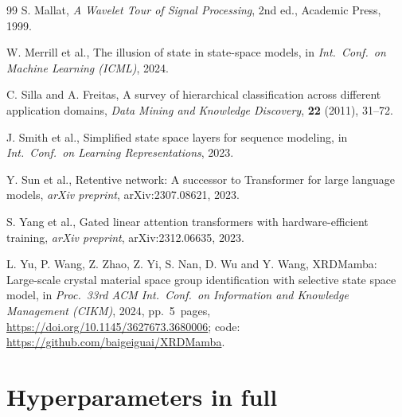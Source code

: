 \documentclass[final]{ws-ijwmip}
\begin{document}
\begin{thebibliography}{99}
S. Mallat, \emph{A Wavelet Tour of Signal Processing}, 2nd ed.,
Academic Press, 1999.

W. Merrill et al., The illusion of state in state-space models, in
\emph{Int.\ Conf.\ on Machine Learning (ICML)}, 2024.

C. Silla and A. Freitas, A survey of hierarchical classification across
different application domains, \emph{Data Mining and Knowledge
Discovery}, \textbf{22} (2011), 31--72.

J. Smith et al., Simplified state space layers for sequence modeling,
in \emph{Int.\ Conf.\ on Learning Representations}, 2023.

Y. Sun et al., Retentive network: A successor to Transformer for large
language models, \emph{arXiv preprint}, arXiv:2307.08621, 2023.

S. Yang et al., Gated linear attention transformers with
hardware-efficient training, \emph{arXiv preprint},
arXiv:2312.06635, 2023.

L. Yu, P. Wang, Z. Zhao, Z. Yi, S. Nan, D. Wu and Y. Wang,
XRDMamba: Large-scale crystal material space group identification
with selective state space model, in \emph{Proc.\ 33rd ACM Int.\ Conf.\
on Information and Knowledge Management (CIKM)}, 2024, pp.~5~pages,
\url{https://doi.org/10.1145/3627673.3680006};
code: \url{https://github.com/baigeiguai/XRDMamba}.

\end{thebibliography}

\appendix

\section{Hyperparameters in full}
\label{app:a}
\end{document}
